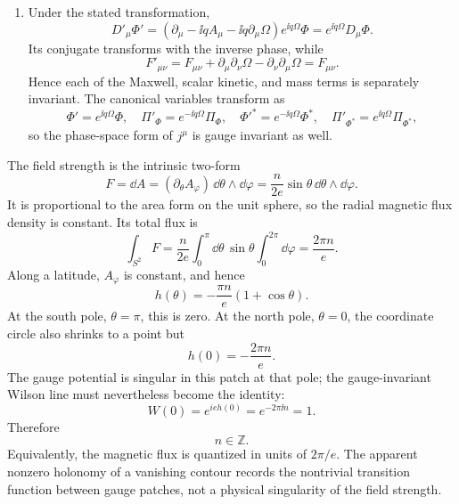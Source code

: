 \begin{enumerate}
\begin{enumerate}
\item
Under the stated transformation,
\[
 D'_\mu\Phi'
 =(\partial_\mu-\ii qA_\mu-\ii q\partial_\mu\Omega)
   e^{\ii q\Omega}\Phi
 =e^{\ii q\Omega}D_\mu\Phi .
\]
Its conjugate transforms with the inverse phase, while
\[
 F'_{\mu\nu}
 =F_{\mu\nu}
 +\partial_\mu\partial_\nu\Omega
 -\partial_\nu\partial_\mu\Omega
 =F_{\mu\nu}.
\]
Hence each of the Maxwell, scalar kinetic, and mass terms is separately
invariant.  The canonical variables transform as
\[
 \Phi'\!=e^{\ii q\Omega}\Phi,\quad
 \Pi'_\Phi=e^{-\ii q\Omega}\Pi_\Phi,\quad
 \Phi'^*\!=e^{-\ii q\Omega}\Phi^*,\quad
 \Pi'_{\Phi^*}=e^{\ii q\Omega}\Pi_{\Phi^*},
\]
so the phase-space form of \(j^\mu\) is gauge invariant as well.
\end{enumerate}

The field strength is the intrinsic two-form
\[
 F=\dd A=(\partial_\theta A_\varphi)\,\dd\theta\wedge \dd\varphi
 =\frac{n}{2e}\sin\theta\,\dd\theta\wedge \dd\varphi.
\]
It is proportional to the area form on the unit sphere, so the radial
magnetic flux density is constant.  Its total flux is
\[
 \boxed{
 \int_{S^2}F
 =\frac{n}{2e}\int_0^\pi \dd\theta\,\sin\theta
 \int_0^{2\pi}\dd\varphi
 =\frac{2\pi n}{e}.}
\]
Along a latitude, \(A_\varphi\) is constant, and hence
\[
 \boxed{h(\theta)=-\frac{\pi n}{e}(1+\cos\theta).}
\]
At the south pole, \(\theta=\pi\), this is zero.  At the north pole,
\(\theta=0\), the coordinate circle also shrinks to a point but
\[
 h(0)=-\frac{2\pi n}{e}.
\]
The gauge potential is singular in this patch at that pole; the
gauge-invariant Wilson line must nevertheless become the identity:
\[
 W(0)=e^{ieh(0)}=e^{-2\pi \ii n}=1.
\]
Therefore
\[
 \boxed{n\in\mathbb Z.}
\]
Equivalently, the magnetic flux is quantized in units of \(2\pi/e\).
The apparent nonzero holonomy of a vanishing contour records the
nontrivial transition function between gauge patches, not a physical
singularity of the field strength.


\end{enumerate}
